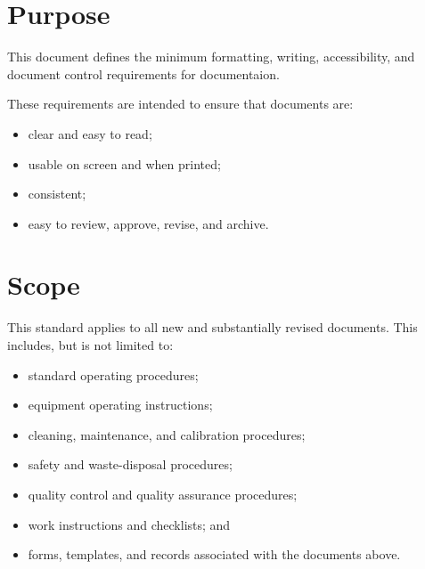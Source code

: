 \section{Purpose}

This document defines the minimum formatting, writing, accessibility, and document control requirements for documentaion.

These requirements are intended to ensure that documents are:
\begin{itemize}
    \item clear and easy to read;
    \item usable on screen and when printed;
    \item consistent;
    \item easy to review, approve, revise, and archive.
\end{itemize}

\section{Scope}

This standard applies to all new and substantially revised documents. This includes, but is not limited to:
\begin{itemize}
    \item standard operating procedures;
    \item equipment operating instructions;
    \item cleaning, maintenance, and calibration procedures;
    \item safety and waste-disposal procedures;
    \item quality control and quality assurance procedures;
    \item work instructions and checklists; and
    \item forms, templates, and records associated with the documents above.
\end{itemize}


